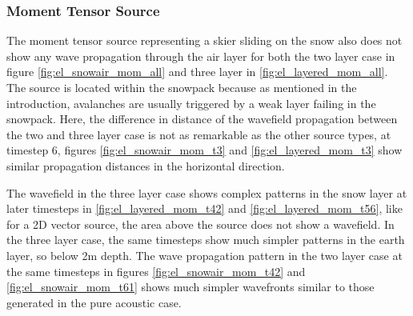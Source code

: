 \documentclass[a4paper,10pt]{article}
\begin{document}
\subsubsection{Moment Tensor Source}
\label{el_tensor}

\noindent The moment tensor source representing a skier sliding on the snow also does not show any wave propagation through the air layer for both the two layer case in figure \ref{fig:el_snowair_mom_all} and three layer in \ref{fig:el_layered_mom_all}. The source is located within the snowpack because as mentioned in the introduction, avalanches are usually triggered by a weak layer failing in the snowpack. Here, the difference in distance of the wavefield propagation between the two and three layer case is not as remarkable as the other source types, at timestep 6, figures \ref{fig:el_snowair_mom_t3} and \ref{fig:el_layered_mom_t3} show similar propagation distances in the horizontal direction. 

\noindent The wavefield in the three layer case shows complex patterns in the snow layer at later timesteps in \ref{fig:el_layered_mom_t42} and \ref{fig:el_layered_mom_t56}, like for a 2D vector source, the area above the source does not show a wavefield. In the three layer case, the same timesteps show much simpler patterns in the earth layer, so below 2m depth. The wave propagation pattern in the two layer case at the same timesteps in figures \ref{fig:el_snowair_mom_t42} and \ref{fig:el_snowair_mom_t61} shows much simpler wavefronts similar to those generated in the pure acoustic case. 
\end{document}

